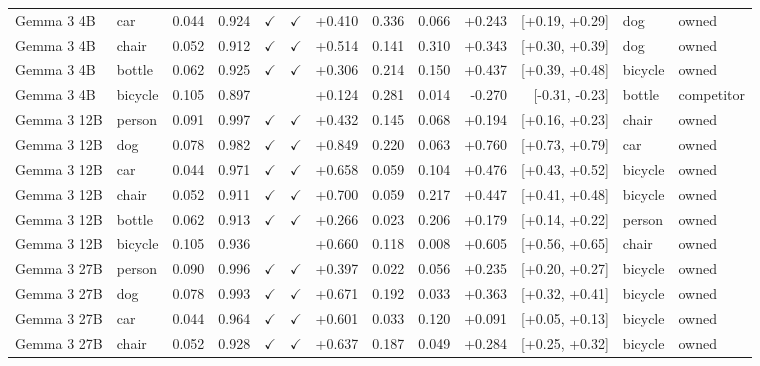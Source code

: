 \begin{longtable}{llrrccrrrrrll}
\rowcolor{cfSlate2}Gemma 3 4B & car & 0.044 & 0.924 & $\checkmark$ & $\checkmark$ & +0.410 & 0.336 & 0.066 & +0.243 & [+0.19, +0.29] & dog & owned \\
\rowcolor{cfSlate2}Gemma 3 4B & chair & 0.052 & 0.912 & $\checkmark$ & $\checkmark$ & +0.514 & 0.141 & 0.310 & +0.343 & [+0.30, +0.39] & dog & owned \\
\rowcolor{cfSlate2}Gemma 3 4B & bottle & 0.062 & 0.925 & $\checkmark$ & $\checkmark$ & +0.306 & 0.214 & 0.150 & +0.437 & [+0.39, +0.48] & bicycle & owned \\
Gemma 3 4B & bicycle & 0.105 & 0.897 &  &  & +0.124 & 0.281 & 0.014 & -0.270 & [-0.31, -0.23] & bottle & competitor \\
\rowcolor{cfSlate2}Gemma 3 12B & person & 0.091 & 0.997 & $\checkmark$ & $\checkmark$ & +0.432 & 0.145 & 0.068 & +0.194 & [+0.16, +0.23] & chair & owned \\
\rowcolor{cfSlate2}Gemma 3 12B & dog & 0.078 & 0.982 & $\checkmark$ & $\checkmark$ & +0.849 & 0.220 & 0.063 & +0.760 & [+0.73, +0.79] & car & owned \\
\rowcolor{cfSlate2}Gemma 3 12B & car & 0.044 & 0.971 & $\checkmark$ & $\checkmark$ & +0.658 & 0.059 & 0.104 & +0.476 & [+0.43, +0.52] & bicycle & owned \\
\rowcolor{cfSlate2}Gemma 3 12B & chair & 0.052 & 0.911 & $\checkmark$ & $\checkmark$ & +0.700 & 0.059 & 0.217 & +0.447 & [+0.41, +0.48] & bicycle & owned \\
\rowcolor{cfSlate2}Gemma 3 12B & bottle & 0.062 & 0.913 & $\checkmark$ & $\checkmark$ & +0.266 & 0.023 & 0.206 & +0.179 & [+0.14, +0.22] & person & owned \\
\rowcolor{cfSlate2}Gemma 3 12B & bicycle & 0.105 & 0.936 &  &  & +0.660 & 0.118 & 0.008 & +0.605 & [+0.56, +0.65] & chair & owned \\
\rowcolor{cfSlate2}Gemma 3 27B & person & 0.090 & 0.996 & $\checkmark$ & $\checkmark$ & +0.397 & 0.022 & 0.056 & +0.235 & [+0.20, +0.27] & bicycle & owned \\
\rowcolor{cfSlate2}Gemma 3 27B & dog & 0.078 & 0.993 & $\checkmark$ & $\checkmark$ & +0.671 & 0.192 & 0.033 & +0.363 & [+0.32, +0.41] & bicycle & owned \\
\rowcolor{cfSlate2}Gemma 3 27B & car & 0.044 & 0.964 & $\checkmark$ & $\checkmark$ & +0.601 & 0.033 & 0.120 & +0.091 & [+0.05, +0.13] & bicycle & owned \\
\rowcolor{cfSlate2}Gemma 3 27B & chair & 0.052 & 0.928 & $\checkmark$ & $\checkmark$ & +0.637 & 0.187 & 0.049 & +0.284 & [+0.25, +0.32] & bicycle & owned \\

\end{longtable}
